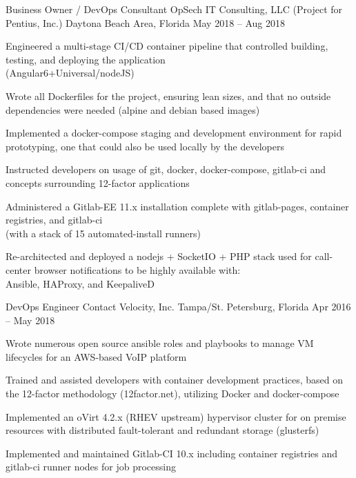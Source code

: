 \documentclass[]{awesome-cv}
\begin{document}
\vspace{-10mm}
\begin{cventries}
	\cventry
	{Business Owner / DevOps Consultant}
	{OpSech IT Consulting, LLC (Project for Pentius, Inc.)}
	{Daytona Beach Area, Florida}
	{May 2018 – Aug 2018}
	{\begin{cvitems}
		\item Engineered a multi-stage CI/CD container pipeline that controlled building, testing, and deploying the application \\ (Angular6+Universal/nodeJS)
		\item Wrote all Dockerfiles for the project, ensuring lean sizes, and that no outside dependencies were needed (alpine and debian based images)
		\item Implemented a docker-compose staging and development environment for rapid prototyping, one that could also be used locally by the developers
		\item Instructed developers on usage of git, docker, docker-compose, gitlab-ci and concepts surrounding 12-factor applications
		\item Administered a Gitlab-EE 11.x installation complete with gitlab-pages, container registries, and gitlab-ci \\ (with a stack of 15 automated-install runners)
		\item Re-architected and deployed a nodejs + SocketIO + PHP stack used for call-center browser notifications to be highly available with: \\ Ansible, HAProxy, and KeepaliveD
		\end{cvitems}}
	\cventry
	{DevOps Engineer}
	{Contact Velocity, Inc.}
	{Tampa/St. Petersburg, Florida}
	{Apr 2016 – May 2018}
	{\begin{cvitems}
		\item {Wrote numerous open source ansible roles and playbooks to manage VM lifecycles for an AWS-based VoIP platform}
		\item {Trained and assisted developers with container development practices, based on the 12-factor methodology (12factor.net), utilizing Docker and docker-compose}
		\item {Implemented an oVirt 4.2.x (RHEV upstream) hypervisor cluster for on premise resources with distributed fault-tolerant and redundant storage (glusterfs)}
		\item {Implemented and maintained Gitlab-CI 10.x including container registries and gitlab-ci \textquotedbl{}runner\textquotedbl{} nodes for job processing}

\end{cvitems}}
\end{cventries}
\end{document}
